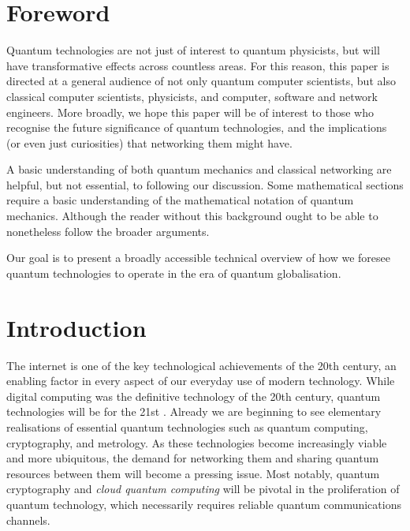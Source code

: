 \documentclass[aps,rmp,twocolumn,amsmath,amssymb,nofootinbib,superscriptaddress]{revtex4}
\begin{document}
\maketitle

\tableofcontents

%
%

\section{Foreword}

Quantum technologies are not just of interest to quantum physicists, but will have transformative effects across countless areas. For this reason, this paper is directed at a general audience of not only quantum computer scientists, but also classical computer scientists, physicists, and computer, software and network engineers. More broadly, we hope this paper will be of interest to those who recognise the future significance of quantum technologies, and the implications (or even just curiosities) that networking them might have.

A basic understanding of both quantum mechanics and classical networking are helpful, but not essential, to following our discussion. Some mathematical sections require a basic understanding of the mathematical notation of quantum mechanics. Although the reader without this background ought to be able to nonetheless follow the broader arguments.

Our goal is to present a broadly accessible technical overview of how we foresee quantum technologies to operate in the era of quantum globalisation.

%
%

\section{Introduction}

The internet is one of the key technological achievements of the 20th century, an enabling factor in every aspect of our everyday use of modern technology. While digital computing was the definitive technology of the 20th century, quantum technologies will be for the 21st \cite{bib:NielsenChuang00}. Already we are beginning to see elementary realisations of essential quantum technologies such as quantum computing, cryptography, and metrology. As these technologies become increasingly viable and more ubiquitous, the demand for networking them and sharing quantum resources between them will become a pressing issue. Most notably, quantum cryptography and \emph{cloud quantum computing} will be pivotal in the proliferation of quantum technology, which necessarily requires reliable quantum communications channels.
\end{document}

